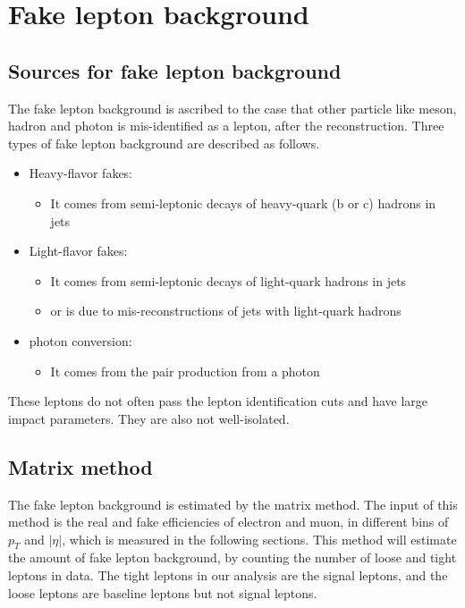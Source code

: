 \section{Fake lepton background}
\label{sec:fake_background}
\subsection{Sources for fake lepton background}
The fake lepton background is ascribed to the case that other particle like meson, hadron and photon is mis-identified as a lepton, after the reconstruction.
Three types of fake lepton background are described as follows.
\begin{itemize}
\item Heavy-flavor fakes:
\begin{itemize}
\item It comes from semi-leptonic decays of heavy-quark (b or c) hadrons in jets
\end{itemize}
\item Light-flavor fakes:
\begin{itemize}
\item It comes from semi-leptonic decays of light-quark hadrons in jets
\item or is due to mis-reconstructions of jets with light-quark hadrons
\end{itemize}
\item photon conversion:
\begin{itemize}
\item It comes from the pair production from a photon
\end{itemize}
\end{itemize}
These leptons do not often pass the lepton identification cuts and have large impact parameters.
They are also not well-isolated.

\subsection{Matrix method}
The fake lepton background is estimated by the matrix method.
The input of this method is the real and fake efficiencies of electron and muon, in different bins of $p_T$ and $|\eta|$, which is measured in the following sections.
This method will estimate the amount of fake lepton background, by counting the number of loose and tight leptons in data.
The tight leptons in our analysis are the signal leptons, and the loose leptons are baseline leptons but not signal leptons.

